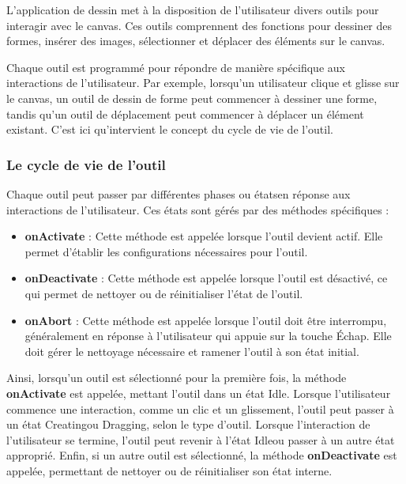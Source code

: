 L'application de dessin met à la disposition de l'utilisateur divers outils pour interagir avec le canvas. Ces outils comprennent des fonctions pour dessiner des formes, insérer des images, sélectionner et déplacer des éléments sur le canvas.

Chaque outil est programmé pour répondre de manière spécifique aux interactions de l'utilisateur. Par exemple, lorsqu'un utilisateur clique et glisse sur le canvas, un outil de dessin de forme peut commencer à dessiner une forme, tandis qu'un outil de déplacement peut commencer à déplacer un élément existant. C'est ici qu'intervient le concept du \guillemotleft cycle de vie de l'outil\guillemotright.

\subsubsection{Le cycle de vie de l'outil}

Chaque outil peut passer par différentes phases ou \guillemotleft états\guillemotright en réponse aux interactions de l'utilisateur. Ces états sont gérés par des méthodes spécifiques :

\begin{itemize}
    \item \textbf{onActivate} : Cette méthode est appelée lorsque l'outil devient actif. Elle permet d'établir les configurations nécessaires pour l'outil.
    \item \textbf{onDeactivate} : Cette méthode est appelée lorsque l'outil est désactivé, ce qui permet de nettoyer ou de réinitialiser l'état de l'outil.
    \item \textbf{onAbort} : Cette méthode est appelée lorsque l'outil doit être interrompu, généralement en réponse à l'utilisateur qui appuie sur la touche Échap. Elle doit gérer le nettoyage nécessaire et ramener l'outil à son état initial.
\end{itemize}

Ainsi, lorsqu'un outil est sélectionné pour la première fois, la méthode \textbf{onActivate} est appelée, mettant l'outil dans un état \guillemotleft Idle\guillemotright. Lorsque l'utilisateur commence une interaction, comme un clic et un glissement, l'outil peut passer à un état \guillemotleft Creating\guillemotright ou \guillemotleft Dragging\guillemotright, selon le type d'outil. Lorsque l'interaction de l'utilisateur se termine, l'outil peut revenir à l'état \guillemotleft Idle\guillemotright ou passer à un autre état approprié. Enfin, si un autre outil est sélectionné, la méthode \textbf{onDeactivate} est appelée, permettant de nettoyer ou de réinitialiser son état interne.


